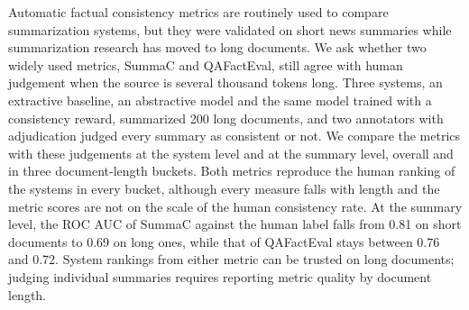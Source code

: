 Automatic factual consistency metrics are routinely used to compare summarization systems, but they were validated on short news summaries while summarization research has moved to long documents. We ask whether two widely used metrics, SummaC and QAFactEval, still agree with human judgement when the source is several thousand tokens long. Three systems, an extractive baseline, an abstractive model and the same model trained with a consistency reward, summarized 200 long documents, and two annotators with adjudication judged every summary as consistent or not. We compare the metrics with these judgements at the system level and at the summary level, overall and in three document-length buckets. Both metrics reproduce the human ranking of the systems in every bucket, although every measure falls with length and the metric scores are not on the scale of the human consistency rate. At the summary level, the ROC AUC of SummaC against the human label falls from 0.81 on short documents to 0.69 on long ones, while that of QAFactEval stays between 0.76 and 0.72. System rankings from either metric can be trusted on long documents; judging individual summaries requires reporting metric quality by document length.
